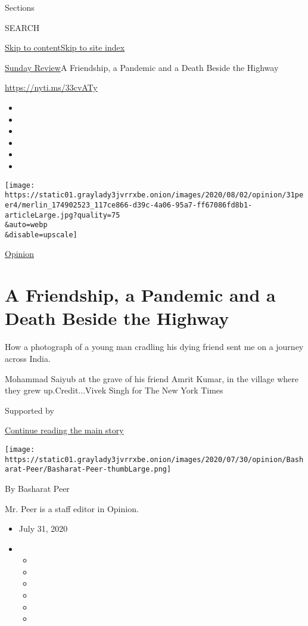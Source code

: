Sections

SEARCH

\protect\hyperlink{site-content}{Skip to
content}\protect\hyperlink{site-index}{Skip to site index}

\href{/section/opinion/sunday}{Sunday Review}\textbar{}A Friendship, a
Pandemic and a Death Beside the Highway

\url{https://nyti.ms/33cvATy}

\begin{itemize}
\item
\item
\item
\item
\item
\item
\end{itemize}

\texttt{[image: https://static01.graylady3jvrrxbe.onion/images/2020/08/02/opinion/31peer4/merlin\_174902523\_117ce866-d39c-4a06-95a7-ff67086fd8b1-articleLarge.jpg?quality=75\\\&auto=webp\\\&disable=upscale]}

\href{/section/opinion}{Opinion}

\hypertarget{a-friendship-a-pandemic-and-a-death-beside-the-highway}{%
\section{A Friendship, a Pandemic and a Death Beside the
Highway}\label{a-friendship-a-pandemic-and-a-death-beside-the-highway}}

How a photograph of a young man cradling his dying friend sent me on a
journey across India.

Mohammad Saiyub at the grave of his friend Amrit Kumar, in the village
where they grew up.Credit...Vivek Singh for The New York Times

Supported by

\protect\hyperlink{after-sponsor}{Continue reading the main story}

\texttt{[image: https://static01.graylady3jvrrxbe.onion/images/2020/07/30/opinion/Basharat-Peer/Basharat-Peer-thumbLarge.png]}

By Basharat Peer

Mr. Peer is a staff editor in Opinion.

\begin{itemize}
\item
  July 31, 2020
\item
  \begin{itemize}
  \item
  \item
  \item
  \item
  \item
  \item
  \end{itemize}
\end{itemize}

